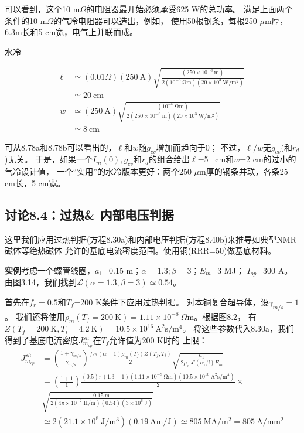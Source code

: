 可以看到，这个10 m$\Omega$的电阻器最开始必须承受625 W的总功率。
满足上面两个条件的10 m$\Omega$的气冷电阻器可以造出，例如，
使用50根钢条，每根250 $\mu$m厚，6.3m长和5 cm宽，电气上并联而成。

水冷\qquad 

\begin{align*}%
\ell&\simeq(0.01\Omega)(250\ \mathrm{A})\sqrt{\frac{(250\times 10^{-6}\ \mathrm{m})}{2(10^{-6}\ \mathrm{\Omega m})(20\times 10^3\ \mathrm{W/m^2})}} \\
&\simeq 20\ \mathrm{cm}\\
w&\simeq(250\ \mathrm{A})\sqrt{\frac{(10^{-6}\ \mathrm{\Omega m})}{2(250\times 10^{-6}\ \mathrm{m})(20\times 10^3\ \mathrm{W/m^2})}} \\
&\simeq 8\ \mathrm{cm}
\end{align*}

可从8.78a和8.78b可以看出的，$\ell$和$w$随$g_{cv}$增加而趋向于0；
不过，$\ell/w$无$g_{cv}$(和$r_d$)无关。
于是，如果一个$I_m(0),g_{cv}$和$r_d$的组合给出$\ell$=5~ cm和$w$=2 cm的过小的气冷设计值，
一个“实用”的水冷版本更好：两个250 $\mu$m厚的钢条并联，各条25 cm长，5 cm宽。

\subsection{讨论8.4：过热\& 内部电压判据}
这里我们应用过热判据(方程8.30a)和内部电压判据(方程8.40b)来推导如典型NMR磁体等绝热磁体
允许的基底电流密度范围。使用铜(RRR=50)做基底材料。

\textbf{实例}\qquad 考虑一个螺管线圈，$a_1$=0.15 m；$\alpha=1.3;\beta=3$；$E_m$=3 MJ；
$I_{op}$=300 A。
由图3.14，我们找到$\mathcal{L}(\alpha=1.3,\beta=3)\simeq 0.54$。

首先在$f_r=0.5$和$T_f$=200 K条件下应用过热判据。
对本铜复合超导体，设$\gamma_{m/s}=1$。
我们还将使用$\rho_m(T_f=200\ \mathrm{K})=1.11\times 10^{-8}\ \Omega$m。根据图8.2，
有$Z(T_f=200\ \mathrm{K},T_i=4.2\ \mathrm{K})=10.5\times 10^{16}\ \mathrm{A^2 s/m^4}$。
将这些参数代入8.30a，我们得到了基底电流密度$J_{m_{op}}^{sh}$在$T_f$允许值为200 K时的
上限：
\begin{align*}%
J_{m_{op}}^{sh}&=\left(\frac{1+\gamma_{m/s}}{\gamma_{m/s}}\right)\frac{f_r\pi(\alpha+1)\rho_m(T_f)Z(T_f,T_i)}{2}\sqrt{\frac{a_1}{2\mu_o\ \mathcal{L}(\alpha,\beta)E_m}} \\ \tag{8.30a}
&=\left(\frac{1+1}{1}\right)\frac{(0.5)\pi(1.3+1)(1.11\times 10^{-8}\ \mathrm{\Omega m})(10.5\times 10^{16}\ \mathrm{A^2s/m^4})}{2}\times \\
&\sqrt{\frac{0.15\ \mathrm{m}}{2(4\pi\times 10^{-7}\ \mathrm{H/m})(0.54)(3\times 10^6\ \mathrm{J})}} \\
&\simeq 2(21.1\times 10^8\ \mathrm{J/m^3})(0.19\ \mathrm{Am/J})\simeq 805\ \mathrm{MA/m^2}=805\ \mathrm{A/mm^2}
\end{align*}

